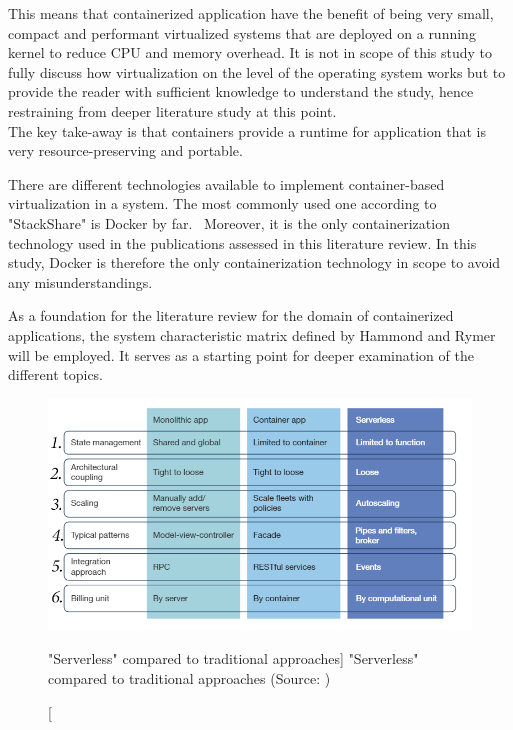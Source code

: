 \begin{enumerate}
    This means that containerized application have the benefit of being very small, compact and performant virtualized systems that are deployed on a running kernel to reduce CPU and memory overhead. It is not in scope of this study to fully discuss how virtualization on the level of the operating system works but to provide the reader with sufficient knowledge to understand the study, hence restraining from deeper literature study at this point. \\
    The key take-away is that containers provide a runtime for application that is very resource-preserving and portable. 
    
    There are different technologies available to implement container-based virtualization in a system. The most commonly used one according to "StackShare" is Docker by far.~ Moreover, it is the only containerization technology used in the publications assessed in this literature review. In this study, Docker is therefore the only containerization technology in scope to avoid any misunderstandings. 
    
    
    
    
    
    
    As a foundation for the literature review for the domain of containerized applications, the system characteristic matrix defined by Hammond and Rymer will be employed. It serves as a starting point for deeper examination of the different topics. 
    
    \begin{figure}[ht]
        \includegraphics[width=\linewidth]{images/serverless/demyst2.png}\centering
        \caption
        ["Serverless" compared to traditional approaches]
        {"Serverless" compared to traditional approaches (Source: \cite{Hammond2018DemystifyingComputing})}
        \label{fig:slessCompared}
    \end{figure}
    

\end{enumerate}
